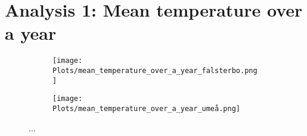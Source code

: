 \section{Analysis 1: Mean temperature over a year}

\begin{figure}[H]
    \centering
    \begin{subfigure}[b]{0.49\linewidth}
        \centering
        \texttt{[image: Plots/mean\_temperature\_over\_a\_year\_falsterbo.png]}
        \caption{}
        \label{fig:meantempfalsterbo}
    \end{subfigure}
    \begin{subfigure}[b]{0.49\linewidth}
        \centering
        \texttt{[image: Plots/mean\_temperature\_over\_a\_year\_umeå.png]}
        \caption{}
        \label{fig:meantempumea}
    \end{subfigure}
    \caption{...}
    \label{}

\end{figure}